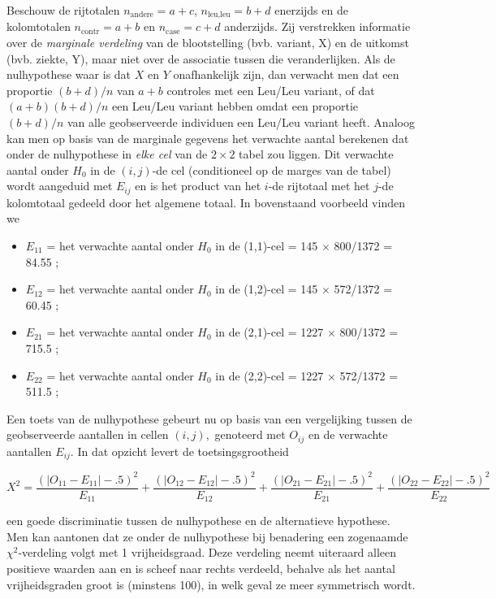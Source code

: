 \documentclass[
  12pt,dutch,coursenotes]{book}
\begin{document}
Beschouw de rijtotalen \(n_\text{andere}=a+c\), \(n_\text{leu,leu}=b+d\) enerzijds en de kolomtotalen \(n_\text{contr}=a+b\) en \(n_\text{case}=c+d\) anderzijds. Zij verstrekken informatie
over de \emph{marginale verdeling} van de blootstelling (bvb. variant, X) en de uitkomst (bvb. ziekte, Y),
maar niet over de associatie tussen die veranderlijken. Als de nulhypothese
waar is dat \(X\) en \(Y\) onafhankelijk zijn, dan verwacht men dat een proportie \((b+d)/n\)
van \(a+b\) controles met een Leu/Leu variant, of dat \((a+b)(b+d)/n\) een Leu/Leu variant hebben omdat een proportie \((b+d)/n\) van alle geobserveerde individuen een Leu/Leu variant heeft.
Analoog kan men op basis van de marginale gegevens het verwachte aantal berekenen dat onder de nulhypothese in \emph{elke cel} van de \(2\times 2\) tabel zou liggen.
Dit verwachte aantal onder \(H_0\) in de \((i,j)\)-de cel (conditioneel op de marges van de tabel) wordt aangeduid met \(E_{ij}\) en is het product
van het \(i\)-de rijtotaal met het \(j\)-de kolomtotaal gedeeld door het
algemene totaal. In bovenstaand voorbeeld vinden we

\begin{itemize}
\item
  \(E_{11}\) = het verwachte aantal onder \(H_0\) in de (1,1)-cel = 145 \(\times\) 800/1372 = 84.55 ;
\item
  \(E_{12}\) = het verwachte aantal onder \(H_0\) in de (1,2)-cel = 145 \(\times\) 572/1372 = 60.45 ;
\item
  \(E_{21}\) = het verwachte aantal onder \(H_0\) in de (2,1)-cel = 1227 \(\times\) 800/1372 = 715.5 ;
\item
  \(E_{22}\) = het verwachte aantal onder \(H_0\) in de (2,2)-cel = 1227 \(\times\) 572/1372 = 511.5 ;
\end{itemize}

Een toets van de nulhypothese gebeurt nu op basis van een vergelijking
tussen de geobserveerde aantallen in cellen \((i,j),\) genoteerd met \(O_{ij}\)
en de verwachte aantallen \(E_{ij}\). In dat opzicht levert de
toetsingsgrootheid

\begin{equation*}
X^2 = \frac{\left (|O_{11} - E_{11}| - .5 \right)^2 }{ E_{11}} + \frac{
\left ( |O_{12} - E_{12}| - .5 \right)^2 }{E_{12} }+ \frac{ \left ( |O_{21}
- E_{21}| - .5 \right)^2 }{E_{21}}+ \frac{ \left ( |O_{22} - E_{22}| - .5
\right)^2 }{E_{22} }
\end{equation*}

een goede discriminatie tussen de nulhypothese en de alternatieve hypothese.
Men kan aantonen dat ze onder de nulhypothese bij benadering een zogenaamde \(\chi^2\)-verdeling volgt met 1 vrijheidsgraad. Deze verdeling neemt uiteraard alleen positieve waarden aan en is scheef naar rechts verdeeld, behalve als het aantal vrijheidsgraden groot is (minstens 100), in welk
geval ze meer symmetrisch wordt.
\end{document}
